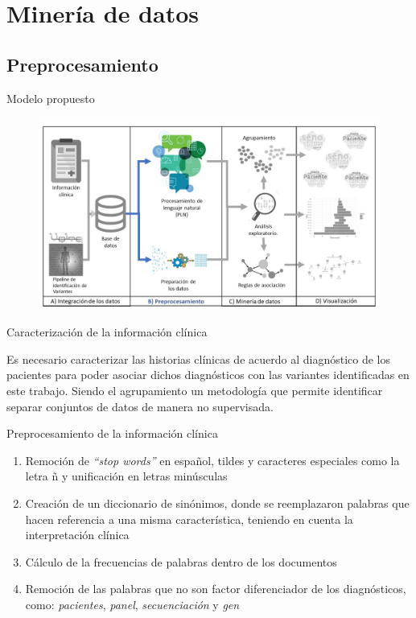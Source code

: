 \documentclass[xcolor=dvipsnames]{beamer}
\begin{document}
\section{Minería de datos}
\subsection{Preprocesamiento}

\begin{frame}{Modelo propuesto}
\begin{figure}
\includegraphics[width=1\textwidth]{Slide3.JPG}
\end{figure}
\end{frame}

\begin{frame}{Caracterización de la información clínica}
\begin{block}{}
\justifying
	{\justifying Es necesario caracterizar las historias clínicas de acuerdo al diagnóstico de los pacientes para poder asociar dichos diagnósticos con las variantes identificadas en este trabajo. Siendo el agrupamiento un metodología que permite identificar separar conjuntos de datos de manera no supervisada.
	}
\end{block}
\end{frame}

\begin{frame}{Preprocesamiento de la información clínica}
   	\begin{enumerate}[1.]
   	
		\justifying 
		\item Remoción de \textit{``stop words''} en español, tildes y caracteres especiales como la letra ñ y  unificación en letras minúsculas
		\item Creación de un diccionario de sinónimos, donde se reemplazaron palabras que hacen referencia a una misma característica, teniendo en cuenta la interpretación clínica
		\item Cálculo de la frecuencias de palabras dentro de los documentos 
		\item Remoción de las palabras que no son factor diferenciador de los diagnósticos, como: \textit{pacientes}, \textit{panel}, \textit{secuenciación} y \textit{gen} 
	   	\end{enumerate}

\end{frame}
\end{document}
